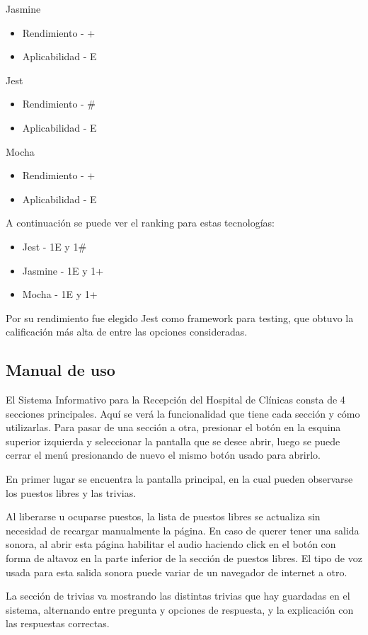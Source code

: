 \documentclass{article}
\begin{document}
Jasmine
\begin{itemize}
    \item Rendimiento - +
    \item Aplicabilidad - E
\end{itemize}
Jest
\begin{itemize}
    \item Rendimiento - \#
    \item Aplicabilidad - E 
\end{itemize}
Mocha
\begin{itemize}
    \item Rendimiento - +
    \item Aplicabilidad - E
\end{itemize}
A continuación se puede ver el ranking para estas tecnologías:
\begin{itemize}
    \item Jest -  1E y 1\#
    \item Jasmine - 1E y 1+
    \item Mocha - 1E y 1+
\end{itemize}
Por su rendimiento fue elegido Jest como framework para testing, que obtuvo la calificación más alta de entre las opciones consideradas.
\newpage
\subsection{Manual de uso}
El Sistema Informativo para la Recepción del Hospital de Clínicas consta de 4 secciones principales. Aquí se verá la funcionalidad que tiene cada sección y cómo utilizarlas. Para pasar de una sección a otra, presionar el botón en la esquina superior izquierda y seleccionar la pantalla que se desee abrir, luego se puede cerrar el menú presionando de nuevo el mismo botón usado para abrirlo.

En primer lugar se encuentra la pantalla principal, en la cual pueden observarse los puestos libres y las trivias.

Al liberarse u ocuparse puestos, la lista de puestos libres se actualiza sin necesidad de recargar manualmente la página. En caso de querer tener una salida sonora, al abrir esta página habilitar el audio haciendo click en el botón con forma de altavoz en la parte inferior de la sección de puestos libres. El tipo de voz usada para esta salida sonora puede variar de un navegador de internet a otro.

La sección de trivias va mostrando las distintas trivias que hay guardadas en el sistema, alternando entre pregunta y opciones de respuesta, y la explicación con las respuestas correctas.
\end{document}
